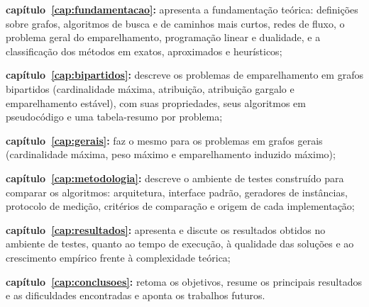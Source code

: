 \begin{alineas}
    \item \textbf{capítulo~\ref{cap:fundamentacao}:} apresenta a fundamentação teórica: definições sobre grafos, algoritmos de busca e de caminhos mais curtos, redes de fluxo, o problema geral do emparelhamento, programação linear e dualidade, e a classificação dos métodos em exatos, aproximados e heurísticos;
    \item \textbf{capítulo~\ref{cap:bipartidos}:} descreve os problemas de emparelhamento em grafos bipartidos (cardinalidade máxima, atribuição, atribuição gargalo e emparelhamento estável), com suas propriedades, seus algoritmos em pseudocódigo e uma tabela-resumo por problema;
    \item \textbf{capítulo~\ref{cap:gerais}:} faz o mesmo para os problemas em grafos gerais (cardinalidade máxima, peso máximo e emparelhamento induzido máximo);
    \item \textbf{capítulo~\ref{cap:metodologia}:} descreve o ambiente de testes construído para comparar os algoritmos: arquitetura, interface padrão, geradores de instâncias, protocolo de medição, critérios de comparação e origem de cada implementação;
    \item \textbf{capítulo~\ref{cap:resultados}:} apresenta e discute os resultados obtidos no ambiente de testes, quanto ao tempo de execução, à qualidade das soluções e ao crescimento empírico frente à complexidade teórica;
    \item \textbf{capítulo~\ref{cap:conclusoes}:} retoma os objetivos, resume os principais resultados e as dificuldades encontradas e aponta os trabalhos futuros.
\end{alineas}
